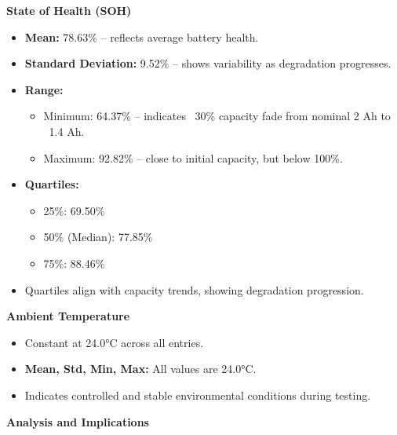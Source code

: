 \textbf{State of Health (SOH)}

\begin{itemize}
    \item \textbf{Mean:} 78.63\% – reflects average battery health.
    \item \textbf{Standard Deviation:} 9.52\% – shows variability as degradation progresses.
    \item \textbf{Range:}
    \begin{itemize}
        \item Minimum: 64.37\% – indicates ~30\% capacity fade from nominal 2 Ah to ~1.4 Ah.
        \item Maximum: 92.82\% – close to initial capacity, but below 100\%.
    \end{itemize}
    \item \textbf{Quartiles:}
    \begin{itemize}
        \item 25\%: 69.50\%
        \item 50\% (Median): 77.85\%
        \item 75\%: 88.46\%
    \end{itemize}
    \item Quartiles align with capacity trends, showing degradation progression.
\end{itemize}

\textbf{Ambient Temperature}

\begin{itemize}
    \item Constant at 24.0°C across all entries.
    \item \textbf{Mean, Std, Min, Max:} All values are 24.0°C.
    \item Indicates controlled and stable environmental conditions during testing.
\end{itemize}

\textbf{Analysis and Implications}

